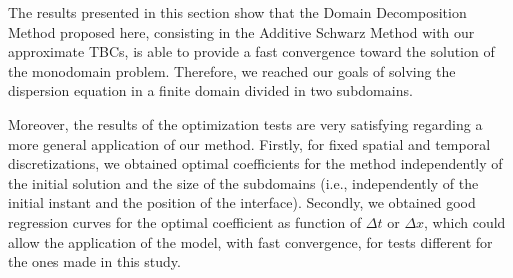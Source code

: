 \indent The results presented in this section show that the Domain Decomposition Method proposed here, consisting in the Additive Schwarz Method with our approximate TBCs, is able to provide a fast convergence toward the solution of the monodomain problem. Therefore, we reached our goals of solving the dispersion equation in a finite domain divided in two subdomains.

\indent Moreover, the results of the optimization tests are very satisfying regarding a more general application of our method. Firstly, for fixed spatial and temporal discretizations, we obtained optimal coefficients for the method independently of the initial solution and the size of the subdomains (i.e., independently of the initial instant and the position of the interface). Secondly, we obtained good regression curves for the optimal coefficient as function of $\Delta t$ or $\Delta x$, which could allow the application of the model, with fast convergence, for tests different for the ones made in this study.